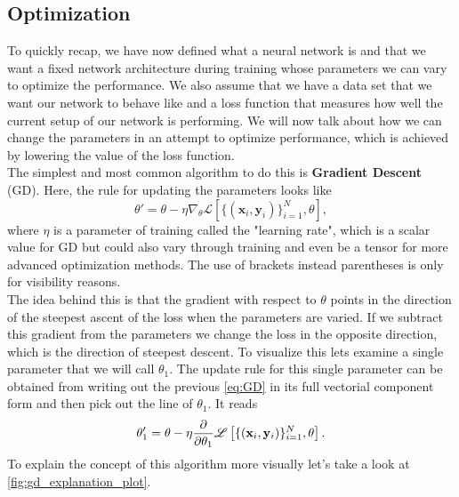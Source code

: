 \subsection{Optimization}\label{sec:NetworkOptimization}
To quickly recap, we have now defined what a neural network is and that we want a fixed network architecture during training whose parameters we can vary to optimize the performance. We also assume that we have a data set that we want our network to behave like and a loss function that measures how well the current setup of our network is performing. We will now talk about how we can change the parameters in an attempt to optimize performance, which is achieved by lowering the value of the loss function.\\
The simplest and most common algorithm to do this is \textbf{Gradient Descent} (GD). Here, the rule for updating the parameters looks like 
\begin{equation}\label{eq:GD}
	\theta' = \theta - \eta \nabla_\theta \mathscr{L}\left[ \{(\mathbf{x}_i, \mathbf{y}_i)\}_{i=1}^{N}, \theta \right],
\end{equation}
where $\eta$ is a parameter of training called the "learning rate", which is a scalar value for GD but could also vary through training and even be a tensor for more advanced optimization methods. The use of brackets instead parentheses is only for visibility reasons.\\
The idea behind this is that the gradient with respect to $\theta$ points in the direction of the steepest ascent of the loss when the parameters are varied. If we subtract this gradient from the parameters we change the loss in the opposite direction, which is the direction of steepest descent. To visualize this lets examine a single parameter that we will call $\theta_1$. The update rule for this single parameter can be obtained from writing out the previous \cref{eq:GD} in its full vectorial component form and then pick out the line of $\theta_1$. It reads
\begin{equation}
	\theta_1' = \theta - \eta \frac{\partial}{\partial\theta_1} \mathscr{L}\left[ \{(\mathbf{x}_i, \mathbf{y}_i)\}_{i=1}^{N}, \theta \right].
\end{equation}
To explain the concept of this algorithm more visually let's take a look at \cref{fig:gd_explanation_plot}. 
